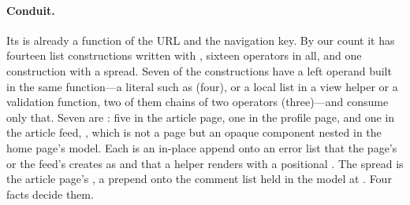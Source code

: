 \paragraph{Conduit.} Its  is already a function of the URL and the navigation key. By our count
it has fourteen list constructions written with \code{++}, sixteen \code{++} operators in all, and one
construction with a spread. Seven of the constructions have a left operand built in the same
function---a literal such as  (four), or a local list in a view helper or a
validation function, two of them chains of two operators (three)---and consume only that. Seven are
: five in the article page, one in the profile page, and one
in the article feed, , which is not a page but an opaque component nested in the home page's
model. Each is an in-place append onto an error list that the page's or the feed's  creates as
\code{[]} and that a helper renders with a positional . The spread is the article page's
, a prepend onto the comment list held in the model at
. Four facts decide them.
